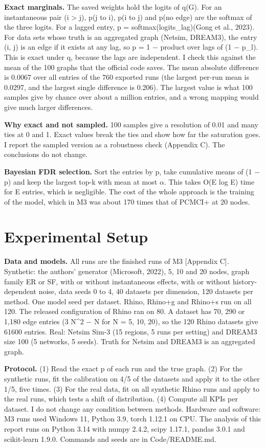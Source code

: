 \documentclass[10pt]{article}
\begin{document}
\textbf{Exact marginals.} The saved weights hold the logits of q(G). For an instantaneous pair (i > j), p(j to i), p(i to j) and p(no edge) are the softmax of the three logits. For a lagged entry, p = softmax(logits\_lag)(Gong et al., 2023). For data sets whose truth is an aggregated graph (Netsim, DREAM3), the entry (i, j) is an edge if it exists at any lag, so p = 1 $-$ product over lags of (1 $-$ p\_l). This is exact under q, because the lags are independent. I check this against the mean of the 100 graphs that the official code saves. The mean absolute difference is 0.0067 over all entries of the 760 exported runs (the largest per-run mean is 0.0297, and the largest single difference is 0.206). The largest value is what 100 samples give by chance over about a million entries, and a wrong mapping would give much larger differences.

\textbf{Why exact and not sampled.} 100 samples give a resolution of 0.01 and many ties at 0 and 1. Exact values break the ties and show how far the saturation goes. I report the sampled version as a robustness check (Appendix C). The conclusions do not change.

\textbf{Bayesian FDR selection.} Sort the entries by p, take cumulative means of (1 $-$ p) and keep the largest top-k with mean at most $\alpha$. This takes O(E log E) time for E entries, which is negligible. The cost of the whole approach is the training of the model, which in M3 was about 170 times that of PCMCI+ at 20 nodes.

\section{Experimental Setup}
\textbf{Data and models.} All runs are the finished runs of M3 [Appendix C]. Synthetic: the authors' generator (Microsoft, 2022), 5, 10 and 20 nodes, graph family ER or SF, with or without instantaneous effects, with or without history-dependent noise, data seeds 0 to 4, 40 datasets per dimension, 120 datasets per method. One model seed per dataset. Rhino, Rhino+g and Rhino+s run on all 120. The released configuration of Rhino ran on 80. A dataset has 70, 290 or 1,180 edge entries (3 N\textasciicircum{}2 $-$ N for N = 5, 10, 20), so the 120 Rhino datasets give 61600 entries. Real: Netsim Sim-3 (15 regions, 5 runs per setting) and DREAM3 size 100 (5 networks, 5 seeds). Truth for Netsim and DREAM3 is an aggregated graph.

\textbf{Protocol.} (1) Read the exact p of each run and the true graph. (2) For the synthetic runs, fit the calibration on 4/5 of the datasets and apply it to the other 1/5, five times. (3) For the real data, fit on all synthetic Rhino runs and apply to the real runs, which tests a shift of distribution. (4) Compute all KPIs per dataset. I do not change any condition between methods. Hardware and software: M3 runs used Windows 11, Python 3.9, torch 1.12.1 on CPU. The analysis of this report runs on Python 3.14 with numpy 2.4.2, scipy 1.17.1, pandas 3.0.1 and scikit-learn 1.9.0. Commands and seeds are in Code/README.md.
\end{document}
